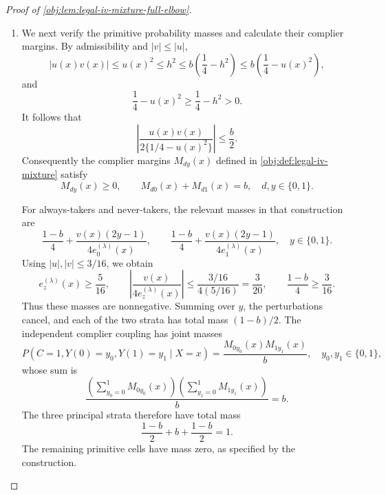 \documentclass[11pt]{article}
\begin{document}
\begin{proof}[Proof of \cref{obj:lem:legal-iv-mixture-full-elbow}]
\begin{enumerate}
The baseline cells of \cref{obj:synth_15} and finite summation in
\cref{obj:def:legal-iv-mixture} give the exact arm means
\[
m_{Dz}(x)=r_z^{(b)}=\frac{1+(2z-1)b}{2},
\qquad
m_{Yz}(x)=
\frac12+\frac{\tau u(x)}{1+2(2z-1)u(x)},
\quad z\in\{0,1\}.
\]
The receipt means are constant and belong to \([3/8,5/8]\). For the outcome means, the denominator satisfies
\[
1+2(2z-1)u(x)\ge1-\frac2{100}=\frac{49}{50}.
\]
Subtracting the two rational expressions gives
\[
m_{Yz}(x)-m_{Yz}(x')
=
\frac{\tau\{u(x)-u(x')\}}
{\{1+2(2z-1)u(x)\}\{1+2(2z-1)u(x')\}}.
\]
Since \(|\tau|\le1\) and \((49/50)^2\ge1/2\),
\[
|m_{Yz}(x)-m_{Yz}(x')|
\le2|u(x)-u(x')|.
\]
Taking \(u(x')=0\) in the same rational comparison gives
\[
\left|m_{Yz}(x)-\frac12\right|
\le2|u(x)|\le\frac1{50},
\]
so the outcome means belong to \([12/25,13/25]\). Their Hölder seminorms satisfy
\[
[m_{Yz}]_{\beta}
\le2c_{\star}(1+2\pi)
\le6\pi c_{\star}
\le L-\frac34<L.
\]
Their supremum norms are at most \(13/25<L\). Thus all density, propensity, and arm-mean Hölder conditions hold, with the range conditions in
\cref{obj:ass:arm-means-holder}. The corresponding center functions are the constants
\[
f_{\mathrm S}=f_{\mathrm T}=1,\qquad
e=\frac12,\qquad
m_{Dz}=r_z^{(b)},\qquad
m_{Yz}=\frac12,
\]
and satisfy the same conditions.

\item
We next verify the primitive probability masses and calculate their complier margins. By admissibility and \(|v|\le|u|\),
\[
|u(x)v(x)|\le u(x)^2\le h^2
\le b\left(\frac14-h^2\right)
\le b\left(\frac14-u(x)^2\right),
\]
and
\[
\frac14-u(x)^2\ge\frac14-h^2>0.
\]
It follows that
\[
\left|
\frac{u(x)v(x)}
{2\{1/4-u(x)^2\}}
\right|\le\frac b2.
\]
Consequently the complier margins \(M_{dy}(x)\) defined in
\cref{obj:def:legal-iv-mixture} satisfy
\[
M_{dy}(x)\ge0,
\qquad
M_{d0}(x)+M_{d1}(x)=b,
\quad d,y\in\{0,1\}.
\]

For always-takers and never-takers, the relevant masses in that construction are
\[
\frac{1-b}{4}
+\frac{v(x)(2y-1)}{4e_0^{(\lambda)}(x)},
\qquad
\frac{1-b}{4}
+\frac{v(x)(2y-1)}{4e_1^{(\lambda)}(x)},
\quad y\in\{0,1\}.
\]
Using \(|u|,|v|\le3/16\), we obtain
\[
e_z^{(\lambda)}(x)\ge\frac5{16},
\qquad
\left|\frac{v(x)}{4e_z^{(\lambda)}(x)}\right|
\le\frac{3/16}{4(5/16)}=\frac3{20},
\qquad
\frac{1-b}{4}\ge\frac3{16}.
\]
Thus these masses are nonnegative. Summing over \(y\), the perturbations cancel, and each of the two strata has total mass \((1-b)/2\). The independent complier coupling has joint masses
\[
P(C=1,Y(0)=y_0,Y(1)=y_1\mid X=x)
=
\frac{M_{0y_0}(x)M_{1y_1}(x)}{b},
\quad y_0,y_1\in\{0,1\},
\]
whose sum is
\[
\frac{
\left(\sum_{y_0=0}^1M_{0y_0}(x)\right)
\left(\sum_{y_1=0}^1M_{1y_1}(x)\right)
}{b}
=b.
\]
The three principal strata therefore have total mass
\[
\frac{1-b}{2}+b+\frac{1-b}{2}=1.
\]
The remaining primitive cells have mass zero, as specified by the construction.


\end{enumerate}
\end{proof}
\end{document}
